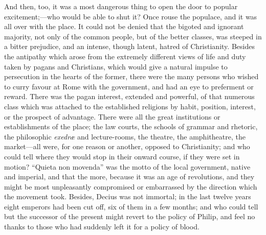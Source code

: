 And then, too, it was a most dangerous thing to open the door to
popular excitement;—who would be able to shut it? Once rouse the
populace, and it was all over with the place. It could not be denied
that the bigoted and ignorant majority, not only of the common people,
but of the better classes, was steeped in a bitter prejudice, and an
intense, though latent, hatred of Christianity. Besides the antipathy
which arose from the extremely different views of life and duty taken
by pagans and Christians, which would give a natural impulse to
persecution in the hearts of the former, there were the many persons
who wished to curry favour at Rome with the government, and had an eye
to preferment or reward. There was the pagan interest, extended and
powerful, of that numerous class which was attached to the
established religions by habit, position, interest, or the prospect of
advantage. There were all the great institutions or establishments of
the place; the law courts, the schools of grammar and rhetoric, the
philosophic \emph{exedræ} and lecture-rooms, the theatre, the
amphitheatre, the market—all were, for one reason or another,
opposed to Christianity; and who could tell where they would stop in
their onward course, if they were set in motion? ``Quieta non
movenda'' was the motto of the local government, native and
imperial, and that the more, because it was an age of revolutions, and
they might be most unpleasantly compromised or embarrassed by the
direction which the movement took. Besides, Decius was not immortal;
in the last twelve years eight emperors had been cut off, six of them
in a few months; and who could tell but the successor of the present
might revert to the policy of Philip, and feel no thanks to those who
had suddenly left it for a policy of blood.


